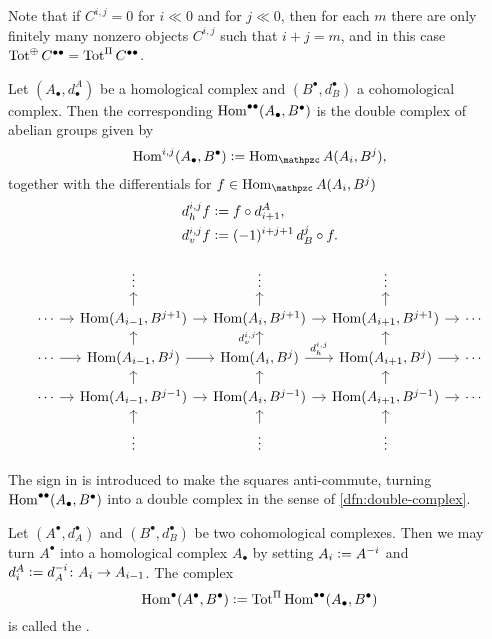 Note that if $C^{i,j} = 0$ for $i \ll 0$ and for $j \ll 0$, then for each $m$
there are only finitely many nonzero objects $C^{i,j}$ such that $i+j = m$, and
in this case $\operatorname{Tot}^\oplus C^{\bullet\bullet} = \operatorname{Tot}^\Pi C^{\bullet\bullet}$.

\begin{definition}
  Let $(A_\bullet,d^A_\bullet)$ be a homological complex and
  $(B^\bullet,d_B^\bullet)$ a cohomological complex. Then the corresponding
   $\operatorname{Hom}^{\bullet\bullet} (A_\bullet, B^\bullet)$ is
  the double complex of abelian groups given by
  $$\Hom^{i,j} (A_\bullet, B^\bullet) \dfn \Hom_\vcateg{A} (A_i, B^j),$$
  together with the differentials for $f\in \Hom_\vcateg{A} (A_i, B^j)$
  \begin{align}
    \notag d_h^{i,j} f & \mathrel{\mathop:}= f\circ d^A_{i+1}, \\
    \label{eqn:signs-in-Hom-double-complex-differential} d_v^{i,j} f & \mathrel{\mathop:}=
                                                                       (-1)^{i+j+1}\,d_B^j\circ f.
  \end{align}

  \[ \begin{tikzcd}[row sep=1em, column sep=1em]
      & \vdots & \vdots & \vdots \\
      \cdots\ar{r} & \Hom (A_{i-1}, B^{j+1})\ar{r}\ar{u} & \Hom (A_i, B^{j+1})\ar{r}\ar{u} & \Hom (A_{i+1}, B^{j+1})\ar{r}\ar{u} & \cdots \\
      \cdots\ar{r} & \Hom (A_{i-1}, B^j)\ar{r}\ar{u} & \Hom (A_i, B^j)\ar{r}{d_h^{i,j}}\ar{u}{d_v^{i,j}} & \Hom (A_{i+1}, B^j)\ar{r}\ar{u} & \cdots \\
      \cdots\ar{r} & \Hom (A_{i-1}, B^{j-1})\ar{r}\ar{u} & \Hom (A_i, B^{j-1})\ar{r}\ar{u} & \Hom (A_{i+1}, B^{j-1})\ar{r}\ar{u} & \cdots \\
      & \vdots\ar{u} & \vdots\ar{u} & \vdots\ar{u}
    \end{tikzcd} \]

  The sign in  is
  introduced to make the squares anti-commute, turning
  $\operatorname{Hom}^{\bullet\bullet} (A_\bullet,B^\bullet)$ into a double complex in the
  sense of \ref{dfn:double-complex}.
\end{definition}

\begin{definition}
  Let $(A^\bullet,d_A^\bullet)$ and $(B^\bullet,d_B^\bullet)$ be two
  cohomological complexes. Then we may turn $A^\bullet$ into a homological
  complex $A_\bullet$ by setting $A_i \mathrel{\mathop:}= A^{-i}$ and
  $d_i^A \mathrel{\mathop:}= d_A^{-i} \colon A_i \to A_{i-1}$. The complex
  \[ \operatorname{Hom}^\bullet (A^\bullet,B^\bullet) \mathrel{\mathop:}=
    \operatorname{Tot}^\Pi \operatorname{Hom}^{\bullet\bullet} (A_\bullet,B^\bullet) \]
  is called the .
\end{definition}

